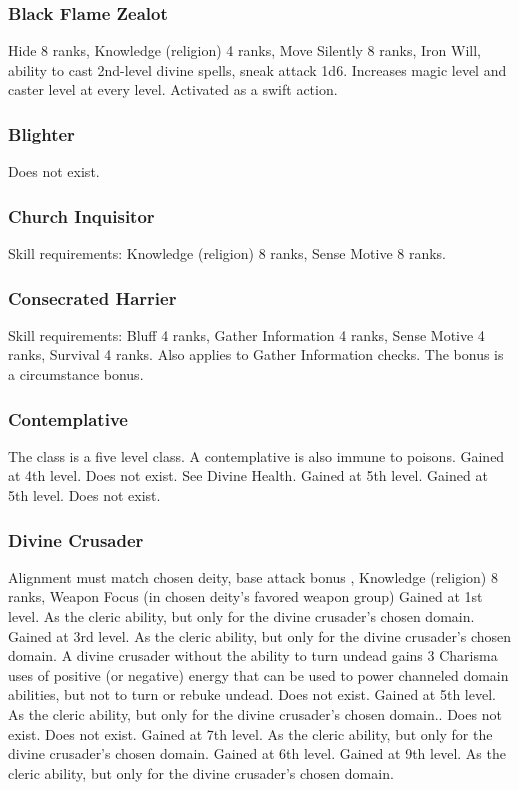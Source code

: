\subsubsection{Black Flame Zealot}
 Hide 8 ranks, Knowledge (religion) 4 ranks, Move Silently 8 ranks, Iron Will, ability to cast 2nd-level divine spells, sneak attack \plus1d6.
 Increases magic level and caster level at every level.
 Activated as a swift action.
\subsubsection{Blighter}
Does not exist.
\subsubsection{Church Inquisitor}
 Skill requirements: Knowledge (religion) 8 ranks, Sense Motive 8 ranks.
\subsubsection{Consecrated Harrier}
 Skill requirements: Bluff 4 ranks, Gather Information 4 ranks, Sense Motive 4 ranks, Survival 4 ranks.
 Also applies to Gather Information checks. The bonus is a circumstance bonus.
\subsubsection{Contemplative}
 The class is a five level class.
 A contemplative is also immune to poisons.
 Gained at 4th level.
 Does not exist. See Divine Health.
 Gained at 5th level.
 Gained at 5th level.
 Does not exist.
\subsubsection{Divine Crusader}
 Alignment must match chosen deity, base attack bonus , Knowledge (religion) 8 ranks, Weapon Focus (in chosen deity's favored weapon group)
 Gained at 1st level. As the cleric ability, but only for the divine crusader's chosen domain.
 Gained at 3rd level. As the cleric ability, but only for the divine crusader's chosen domain. A divine crusader without the ability to turn undead gains 3 \add Charisma uses of positive (or negative) energy that can be used to power channeled domain abilities, but not to turn or rebuke undead.
 Does not exist.
 Gained at 5th level. As the cleric ability, but only for the divine crusader's chosen domain..
 Does not exist.
 Does not exist.
 Gained at 7th level. As the cleric ability, but only for the divine crusader's chosen domain.
 Gained at 6th level.
 Gained at 9th level. As the cleric ability, but only for the divine crusader's chosen domain.
